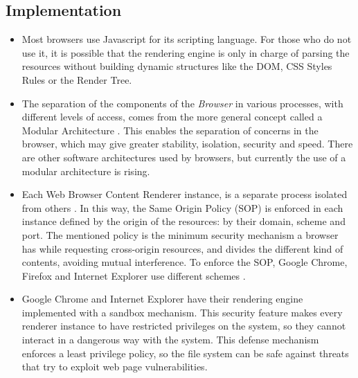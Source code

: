 \documentclass[]{acmlarge}
\begin{document}
    

  \subsection*{Implementation}
    \begin{itemize}\leftskip0.2em
      \item Most browsers use Javascript for its scripting language. For those who do not use it, it is possible that the rendering engine is only in charge of parsing the resources without building dynamic structures like the DOM, CSS Styles Rules or the Render Tree.
      \item The separation of the components of the \textit{Browser} in various processes, with different levels of access, comes from the more general concept called a Modular Architecture \cite{Vrbanec2013}. This enables the separation of concerns in the browser, which may give greater stability, isolation, security and speed. There are other software architectures used by browsers, but currently the use of a modular architecture is rising.
      \item Each Web Browser Content Renderer instance, is a separate process isolated from others \cite{GoogleChromeIsolation,FirefoxThreatModel}. In this way, the Same Origin Policy (SOP) \cite{W3C-SOP} is enforced in each instance defined by the origin of the resources: by their domain, scheme and port. The mentioned policy is the minimum security mechanism a browser has while requesting cross-origin resources, and divides the different kind of contents, avoiding mutual interference. To enforce the SOP, Google Chrome, Firefox and Internet Explorer use different schemes \cite{Crowley2010,Reis2009,Jackson2008}.
      \item Google Chrome and Internet Explorer have their rendering engine implemented with a sandbox mechanism. This security feature makes every renderer instance to have restricted privileges on the system, so they cannot interact in a dangerous way with the system. This defense mechanism enforces a least privilege policy, so the file system can be safe against threats that try to exploit web page vulnerabilities.
    \end{itemize}
\end{document}
